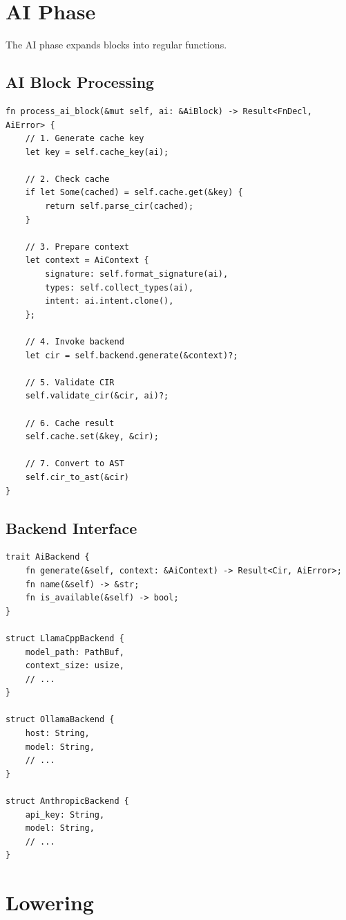 \section{AI Phase}

The AI phase expands  blocks into regular functions.

\subsection{AI Block Processing}

\begin{lstlisting}[language={}]
fn process_ai_block(&mut self, ai: &AiBlock) -> Result<FnDecl, AiError> {
    // 1. Generate cache key
    let key = self.cache_key(ai);

    // 2. Check cache
    if let Some(cached) = self.cache.get(&key) {
        return self.parse_cir(cached);
    }

    // 3. Prepare context
    let context = AiContext {
        signature: self.format_signature(ai),
        types: self.collect_types(ai),
        intent: ai.intent.clone(),
    };

    // 4. Invoke backend
    let cir = self.backend.generate(&context)?;

    // 5. Validate CIR
    self.validate_cir(&cir, ai)?;

    // 6. Cache result
    self.cache.set(&key, &cir);

    // 7. Convert to AST
    self.cir_to_ast(&cir)
}
\end{lstlisting}

\subsection{Backend Interface}

\begin{lstlisting}[language={}]
trait AiBackend {
    fn generate(&self, context: &AiContext) -> Result<Cir, AiError>;
    fn name(&self) -> &str;
    fn is_available(&self) -> bool;
}

struct LlamaCppBackend {
    model_path: PathBuf,
    context_size: usize,
    // ...
}

struct OllamaBackend {
    host: String,
    model: String,
    // ...
}

struct AnthropicBackend {
    api_key: String,
    model: String,
    // ...
}
\end{lstlisting}

\section{Lowering}

